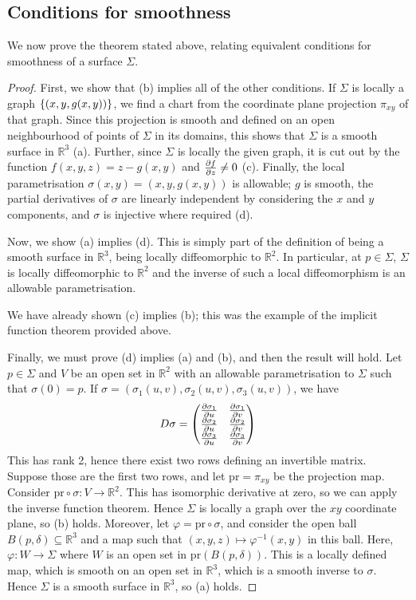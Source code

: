 \subsection{Conditions for smoothness}
We now prove the theorem stated above, relating equivalent conditions for smoothness of a surface \( \Sigma \).
\begin{proof}
	First, we show that (b) implies all of the other conditions.
	If \( \Sigma \) is locally a graph \( \qty{(x,y,g(x,y))} \), we find a chart from the coordinate plane projection \( \pi_{xy} \) of that graph.
	Since this projection is smooth and defined on an open neighbourhood of points of \( \Sigma \) in its domains, this shows that \( \Sigma \) is a smooth surface in \( \mathbb R^3 \) (a).
	Further, since \( \Sigma \) is locally the given graph, it is cut out by the function \( f(x,y,z) = z - g(x,y) \) and \( \pdv{f}{z} \neq 0 \) (c).
	Finally, the local parametrisation \( \sigma(x,y) = (x,y,g(x,y)) \) is allowable; \( g \) is smooth, the partial derivatives of \( \sigma \) are linearly independent by considering the \( x \) and \( y \) components, and \( \sigma \) is injective where required (d).

	Now, we show (a) implies (d).
	This is simply part of the definition of being a smooth surface in \( \mathbb R^3 \), being locally diffeomorphic to \( \mathbb R^2 \).
	In particular, at \( p \in \Sigma \), \( \Sigma \) is locally diffeomorphic to \( \mathbb R^2 \) and the inverse of such a local diffeomorphism is an allowable parametrisation.

	We have already shown (c) implies (b); this was the example of the implicit function theorem provided above.

	Finally, we must prove (d) implies (a) and (b), and then the result will hold.
	Let \( p \in \Sigma \) and \( V \) be an open set in \( \mathbb R^2 \) with an allowable parametrisation to \( \Sigma \) such that \( \sigma(0) = p \).
	If \( \sigma = (\sigma_1(u,v), \sigma_2(u,v), \sigma_3(u,v)) \), we have
	\[ D\sigma = \begin{pmatrix}
		\pdv{\sigma_1}{u} & \pdv{\sigma_1}{v} \\
		\pdv{\sigma_2}{u} & \pdv{\sigma_2}{v} \\
		\pdv{\sigma_3}{u} & \pdv{\sigma_3}{v}
	\end{pmatrix} \]
	This has rank 2, hence there exist two rows defining an invertible matrix.
	Suppose those are the first two rows, and let \( \mathrm{pr} = \pi_{xy} \) be the projection map.
	Consider \( \mathrm{pr} \circ \sigma \colon V \to \mathbb R^2 \).
	This has isomorphic derivative at zero, so we can apply the inverse function theorem.
	Hence \( \Sigma \) is locally a graph over the \( xy \) coordinate plane, so (b) holds.
	Moreover, let \( \varphi = \mathrm{pr} \circ \sigma \), and consider the open ball \( B(p, \delta) \subseteq \mathbb R^3 \) and a map such that \( (x,y,z) \mapsto \varphi^{-1}(x,y) \) in this ball.
	Here, \( \varphi \colon W \to \Sigma \) where \( W \) is an open set in \( \mathrm{pr}(B(p, \delta)) \).
	This is a locally defined map, which is smooth on an open set in \( \mathbb R^3 \), which is a smooth inverse to \( \sigma \).
	Hence \( \Sigma \) is a smooth surface in \( \mathbb R^3 \), so (a) holds.
\end{proof}
